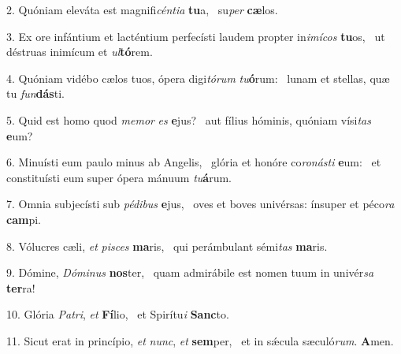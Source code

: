 2. Quóniam eleváta est magnifi\textit{cén}\textit{ti}\textit{a} \textbf{tu}a, \ast\  su\textit{per} \textbf{cæ}los.\

3. Ex ore infántium et lacténtium perfecísti laudem propter in\textit{i}\textit{mí}\textit{cos} \textbf{tu}os, \ast\  ut déstruas inimícum et \textit{ul}\textbf{tó}rem.\

4. Quóniam vidébo cælos tuos, ópera digi\textit{tó}\textit{rum} \textit{tu}\textbf{ó}rum: \ast\  lunam et stellas, quæ tu \textit{fun}\textbf{dás}ti.\

5. Quid est homo quod \textit{me}\textit{mor} \textit{es} \textbf{e}jus? \ast\  aut fílius hóminis, quóniam vísi\textit{tas} \textbf{e}um?\

6. Minuísti eum paulo minus ab Angelis, \dag\  glória et honóre co\textit{ro}\textit{nás}\textit{ti} \textbf{e}um: \ast\  et constituísti eum super ópera mánuum \textit{tu}\textbf{á}rum.\

7. Omnia subjecísti sub \textit{pé}\textit{di}\textit{bus} \textbf{e}jus, \ast\  oves et boves univérsas: ínsuper et péco\textit{ra} \textbf{cam}pi.\

8. Vólucres cæli, \textit{et} \textit{pi}\textit{sces} \textbf{ma}ris, \ast\  qui perámbulant sémi\textit{tas} \textbf{ma}ris.\

9. Dómine, \textit{Dó}\textit{mi}\textit{nus} \textbf{nos}ter, \ast\  quam admirábile est nomen tuum in univér\textit{sa} \textbf{ter}ra!\

10. Glória \textit{Pa}\textit{tri}, \textit{et} \textbf{Fí}lio, \ast\  et Spirítu\textit{i} \textbf{Sanc}to.\

11. Sicut erat in princípio, \textit{et} \textit{nunc}, \textit{et} \textbf{sem}per, \ast\  et in sǽcula sæculó\textit{rum}. \textbf{A}men.\

